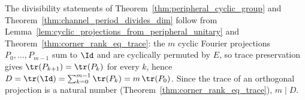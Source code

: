 The divisibility statements of Theorem~\ref{thm:peripheral_cyclic_group} and
Theorem~\ref{thm:channel_period_divides_dim} follow from
Lemma~\ref{lem:cyclic_projections_from_peripheral_unitary} and
Theorem~\ref{thm:corner_rank_eq_trace}: the $m$ cyclic Fourier projections
$P_0,\ldots,P_{m-1}$ sum to $\Id$ and are cyclically permuted by $E$, so
trace preservation gives $\tr(P_{k+1})=\tr(P_k)$ for every $k$, hence
$D=\tr(\Id)=\sum_{k=0}^{m-1}\tr(P_k)=m\,\tr(P_0)$. Since the trace of an
orthogonal projection is a natural number (Theorem~\ref{thm:corner_rank_eq_trace}),
$m\mid D$.
